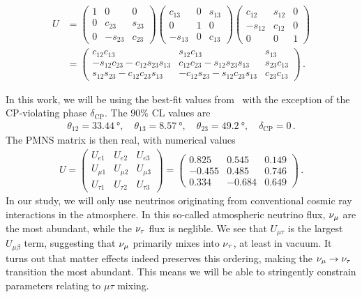 \begin{align}
    U &=
    \begin{pmatrix}1 & 0 & 0 \\ 0 & c_{23} & s_{23} \\ 0 & -s_{23} & c_{23}\end{pmatrix}
\begin{pmatrix}c_{13} & 0 & s_{13} \\ 0 & 1 & 0 \\ -s_{13}  & 0 & c_{13}\end{pmatrix}
\begin{pmatrix}c_{12} & s_{12} & 0 \\ -s_{12} & c_{12} & 0 \\ 0 & 0 & 1\end{pmatrix} \nonumber \\
    &= 
    \begin{pmatrix}c_{12} c_{13} & s_{12} c_{13} & s_{13} \\ 
        -s_{12} c_{23}-c_{12} s_{23} s_{13} & c_{12} c_{23}-s_{12} s_{23} s_{13} & s_{23} c_{13} \\ 
        s_{12} s_{23}-c_{12} c_{23} s_{13}  & -c_{12} s_{23}-s_{12} c_{23} s_{13} & c_{23} c_{13}
    \end{pmatrix}\,.
\end{align}

In this work, we will be using the best-fit values from~\cite{nufit} with the exception of the CP-violating phase $\delta_\text{CP}$. The $90\% $ CL values are
\begin{align}\label{eq:nufitparams}
    \theta_{12} = \SI{33.44}{\degree},\hspace{1em} \theta_{13} = \SI{8.57}{\degree},\hspace{1em} \theta_{23} = \SI{49.2}{\degree}, \hspace{1em} \delta_\text{CP} = 0\,.
\end{align}
The PMNS matrix is then real, with numerical values 
\begin{align}\label{eq:Uvalues}
    U = \begin{pmatrix}
        U_{e 1} & U_{e2} & U_{e3} \\
        U_{\mu 1} & U_{\mu 2} & U_{\mu 3} \\
        U_{\tau 1} & U_{\tau 2} & U_{\tau 3}
    \end{pmatrix} 
    = \begin{pmatrix}
        0.825 & 0.545 & 0.149 \\
        -0.455 & 0.485 & 0.746 \\
        0.334 & -0.684 & 0.649
    \end{pmatrix} \,.
\end{align}
In our study, we will only use neutrinos originating from conventional cosmic ray interactions in the atmosphere. 
In this so-called atmospheric neutrino flux, $\nu_\mu$ are the most abundant, while the $\nu_\tau$ flux is neglible. We see that $U_{\mu\tau}$ is the largest $U_{\mu\beta}$ term,
suggesting that $\nu_\mu$ primarily mixes into $\nu_\tau$, at least in vacuum. It turns out that matter effects indeed preserves this ordering, making the $\nu_\mu \to \nu_\tau$ transition
the most abundant. This means we will be able to stringently constrain parameters relating to $\mu\tau$ mixing.

